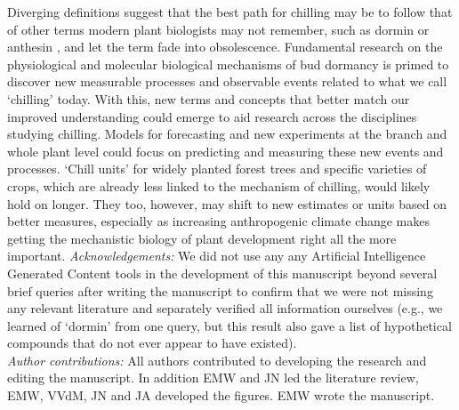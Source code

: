 \documentclass[11pt]{article}
\begin{document}
Diverging definitions suggest that the best path for chilling may be to follow that of other terms modern plant biologists may not remember, such as dormin or anthesin \citep[hypothesized compounds to induce dormancy and floral anthesis, respectively,][]{aksenova2006florigen,dorffling2015discovery}, and let the term fade into obsolescence. Fundamental research on the physiological and molecular biological mechanisms of bud dormancy is primed to discover new measurable processes and observable events related to what we call `chilling' today. With this, new terms and concepts that better match our improved understanding could emerge to aid research across the disciplines studying chilling. Models for forecasting and new experiments at the branch and whole plant level could focus on predicting and measuring these new events and processes. `Chill units'  for widely planted forest trees and specific varieties of crops, which are already less linked to the mechanism of chilling, would likely hold on longer. They too, however, may shift to new estimates or units based on better measures, especially as increasing anthropogenic climate change makes getting the mechanistic biology of plant development right all the more important. 
\newpage
\emph{Acknowledgements:} We did not use any any Artificial Intelligence Generated Content tools in the development of this manuscript beyond several brief queries after writing the manuscript to confirm that we were not missing any relevant literature and separately verified all information ourselves (e.g., we learned of `dormin' from one query, but this result also gave a list of hypothetical compounds that do not ever appear to have existed). \\
\emph{Author contributions:}  All authors contributed to developing the research and editing the manuscript. In addition EMW and JN led the literature review, EMW, VVdM, JN and JA developed the figures. EMW wrote the manuscript. %
\end{document}
